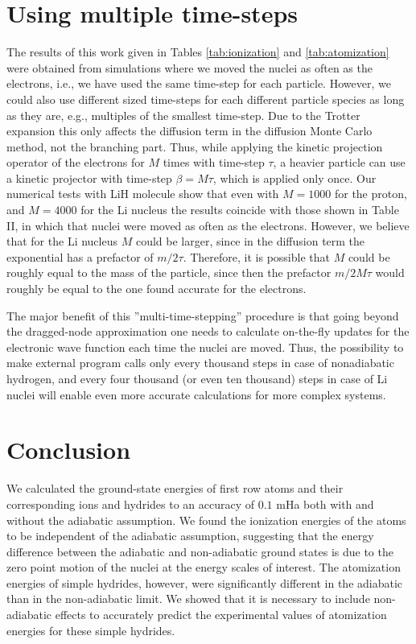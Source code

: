\documentclass[pra,superscriptaddress,groupedaddress,twocolumn]{revtex4}
\begin{document}


\section{Using multiple time-steps}
The results of this work given in Tables \ref{tab:ionization} and \ref{tab:atomization} were obtained from simulations where we moved the nuclei as often as the electrons, i.e., we have used the same time-step for each particle. However, we could also use different sized time-steps for each different particle species as long as they are, e.g., multiples of the smallest time-step. Due to the Trotter expansion \cite{lester1} this only affects the diffusion term in the diffusion Monte Carlo method, not the branching part. Thus, while applying the kinetic projection operator of the electrons for $M$ times with time-step $\tau$, a heavier particle can use a kinetic projector with time-step $\beta=M\tau$, which is applied only once. Our numerical tests with LiH molecule show that even with $M=1000$ for the proton, and $M=4000$ for the Li nucleus the results coincide with those shown in Table II, in which that nuclei were moved as often as the electrons. However, we believe that for the Li nucleus $M$ could be larger, since in the diffusion term the exponential has a prefactor of $m/2\tau$. Therefore, it is possible that $M$ could be roughly equal to the mass of the particle, since then the prefactor $m/2M\tau$ would roughly be equal to the one found accurate for the electrons.

The major benefit of this ''multi-time-stepping'' procedure is that going beyond the dragged-node approximation one needs to calculate on-the-fly updates for the electronic wave function each time the nuclei are moved. Thus, the possibility to make external program calls only every thousand steps in case of nonadiabatic hydrogen, and every four thousand (or even ten thousand) steps in case of Li nuclei will enable even more accurate calculations for more complex systems.

\section{Conclusion}
We calculated the ground-state energies of first row atoms and their corresponding ions and hydrides to an accuracy of $0.1$ mHa both with and without the adiabatic assumption. We found the ionization energies of the atoms to be independent of the adiabatic assumption, suggesting that the energy difference between the adiabatic and non-adiabatic ground states is due to the zero point motion of the nuclei at the energy scales of interest. The atomization energies of simple hydrides, however, were significantly different in the adiabatic than in the non-adiabatic limit.   We showed that it is necessary to include non-adiabatic effects to accurately predict the experimental values of atomization energies for these simple hydrides.
\end{document}
